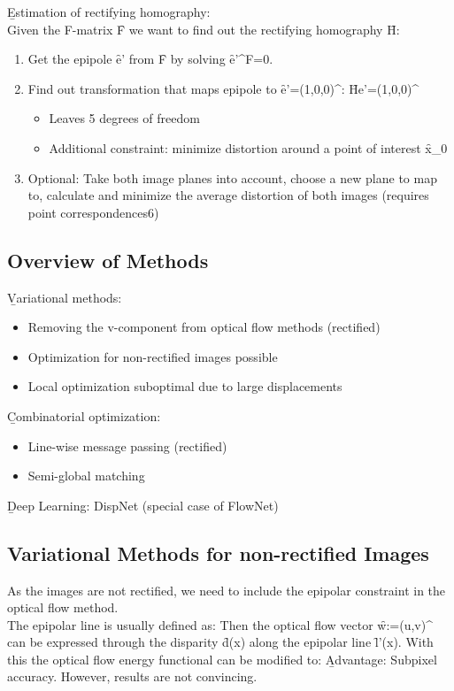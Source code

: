 \b{Estimation of rectifying homography:\\[0.5em]}
Given the F-matrix \f{F} we want to find out the rectifying homography \f{H}:
\begin{enumerate}
    \item Get the epipole \f{e'} from \f{F} by solving \f{e'^\top F=0}.
    \item Find out transformation that maps epipole to \f{e'=(1,0,0)^\top}: \f{He'=(1,0,0)^\top}
    \begin{itemize}
        \item Leaves 5 degrees of freedom
        \item Additional constraint: minimize distortion around a point of interest \f{x_0}
    \end{itemize}
    \item Optional: Take both image planes into account, choose a new plane to map to, calculate and minimize the average distortion of both images (requires point correspondences6)
\end{enumerate}

\subsection{Overview of Methods}
\b{Variational methods:}
\begin{itemize}
    \item Removing the v-component from optical flow methods (rectified)
    \item Optimization for non-rectified images possible
    \item Local optimization suboptimal due to large displacements
\end{itemize}
\newpage
\b{Combinatorial optimization:}
\begin{itemize}
    \item Line-wise message passing (rectified)
    \item Semi-global matching
\end{itemize}
\b{Deep Learning:} DispNet (special case of FlowNet)

\subsection{Variational Methods for non-rectified Images}
As the images are not rectified, we need to include the epipolar constraint in the optical flow method.\\
The epipolar line is usually defined as:
Then the optical flow vector \f{w:=(u,v)^\top} can be expressed through the disparity \f{d(x)} along the epipolar line \f{l'(x)}. With this the optical flow energy functional can be modified to:
\b{Advantage:} Subpixel accuracy. However, results are not convincing.

